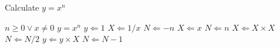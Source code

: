 \Blindtext
\begin{algorithm} %
\caption{Calculate $y = x^n$} %
\label{alg1} %
\begin{algorithmic}[1] %
    \REQUIRE $n \geq 0 \vee x \neq 0$
    \ENSURE $y = x^n$
    \STATE $y \Leftarrow 1$
        \STATE $X \Leftarrow 1 / x$
        \STATE $N \Leftarrow -n$
    \ELSE
        \STATE $X \Leftarrow x$
        \STATE $N \Leftarrow n$
    \ENDIF
            \STATE $X \Leftarrow X \times X$
            \STATE $N \Leftarrow N / 2$
        \ELSE[$N$ is odd]
            \STATE $y \Leftarrow y \times X$
            \STATE $N \Leftarrow N - 1$
        \ENDIF
    \ENDWHILE
\end{algorithmic}
\end{algorithm}
\Blindtext
